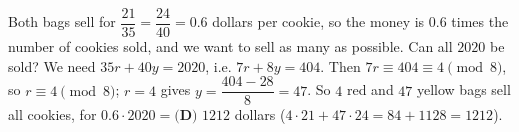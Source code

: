 Both bags sell for $\dfrac{21}{35}=\dfrac{24}{40}=0.6$ dollars per cookie, so the money is $0.6$ times the number of cookies sold, and we want to sell as many as possible. Can all $2020$ be sold? We need $35r+40y=2020$, i.e. $7r+8y=404$. Then $7r\equiv404\equiv4\pmod8$, so $r\equiv4\pmod8$; $r=4$ gives $y=\dfrac{404-28}{8}=47$. So $4$ red and $47$ yellow bags sell all cookies, for $0.6\cdot2020=\boxed{\textbf{(D) }1212}$ dollars ($4\cdot21+47\cdot24=84+1128=1212$).
